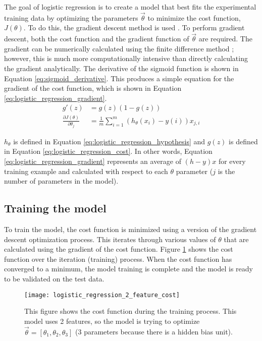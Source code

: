 The goal of logistic regression is to create a model that best fits the experimental training data by optimizing the parameters $\vec{\theta}$ to minimize the cost function, $J(\theta)$.  To do this, the gradient descent method is used \cite{gradient_descent}.  To  perform gradient descent, both the cost function and the gradient function of $\vec{\theta}$ are required.  The gradient can be numerically calculated using the finite difference method \cite{finite_difference_method}; however, this is much more computationally intensive than directly calculating the gradient analytically.  The derivative of the sigmoid function is shown in Equation \ref{eq:sigmoid_derivative}.  This produces a simple equation for the gradient of the cost function, which is shown in Equation \ref{eq:logistic_regression_gradient}.
\begin{align}
	g\prime(z) &= g(z) (1-g(z)) \label{eq:sigmoid_derivative} \\
	\frac{\partial J(\theta)}{\partial \theta_j} &= \frac{1}{m} \sum_{i=1}^{m}{\left(h_{\theta}(x_i) - y(i)\right) x_{j,i}} \label{eq:logistic_regression_gradient}
\end{align}

$h_{\theta}$ is defined in Equation \ref{eq:logistic_regression_hypothesis} and $g(z)$ is defined in Equation \ref{eq:logistic_regression_cost}.  In other words, Equation \ref{eq:logistic_regression_gradient} represents an average of $(h-y)x$ for every training example and calculated with respect to each $\theta$ parameter ($j$ is the number of parameters in the model).

\subsection{Training the model}
To train the model, the cost function is minimized using a version of the gradient descent optimization process.  This iterates through various values of $\theta$ that are calculated using the gradient of the cost function.  Figure \ref{fig:logistic_regression_2_feature_cost} shows the cost function over the iteration (training) process.  When the cost function has converged to a minimum, the model training is complete and the model is ready to be validated on the test data.

\begin{figure}
	\centering
	\texttt{[image: logistic\_regression\_2\_feature\_cost]}
	\decoRule
	\caption{This figure shows the cost function during the training process.  This model uses 2 features, so the model is trying to optimize $\vec{\theta} = [\theta_1, \theta_2, \theta_3]$ (3 parameters because there is a hidden bias unit).}
	\label{fig:logistic_regression_2_feature_cost}
\end{figure}

